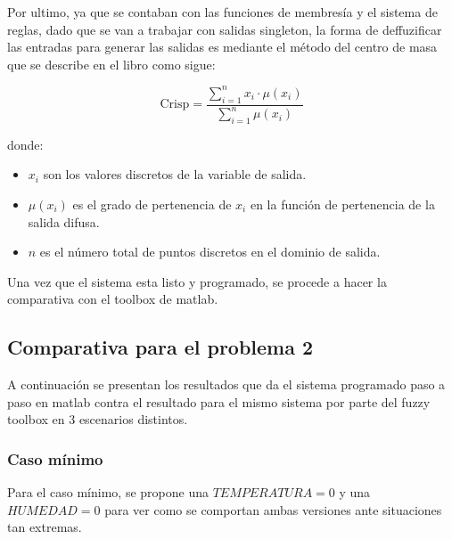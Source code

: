\documentclass[11pt, letterpaper]{article}
\begin{document}
\newpage

Por ultimo, ya que se contaban con las funciones de membresía y el sistema de reglas, dado que se van a trabajar con salidas singleton, la forma de deffuzificar las entradas para generar las salidas es mediante el método del centro de masa que se describe en el libro como sigue:


$$
\text{Crisp} = \frac{\sum_{i=1}^{n} x_i \cdot \mu(x_i)}{\sum_{i=1}^{n} \mu(x_i)}
$$

donde:
\begin{itemize}
	\item \( x_i \) son los valores discretos de la variable de salida.
	\item \( \mu(x_i) \) es el grado de pertenencia de \( x_i \) en la función de pertenencia de la salida difusa.
	\item \( n \) es el número total de puntos discretos en el dominio de salida.
\end{itemize}

Una vez que el sistema esta listo y programado, se procede a hacer la comparativa con el toolbox de matlab.

\newpage

\subsection{Comparativa para el problema 2}

A continuación se presentan los resultados que da el sistema programado paso a paso en matlab contra el resultado para el mismo sistema por parte del fuzzy toolbox en 3 escenarios distintos.

\subsubsection{Caso mínimo}

Para el caso mínimo, se propone una $TEMPERATURA = 0$ y una $HUMEDAD = 0$ para ver como se comportan ambas versiones ante situaciones tan extremas.
\end{document}
